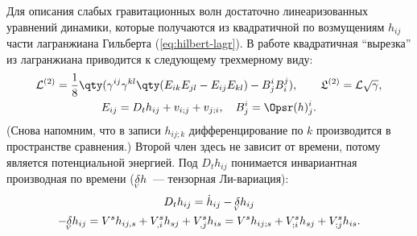 \documentclass[\docroot/reports/draft/report.tex]{subfiles}
\begin{document}
    Для описания слабых гравитационных волн достаточно линеаризованных уравнений динамики, которые получаются из квадратичной по возмущениям $h_{ij}$ части лагранжиана Гильберта (\autoref{eq:hilbert-lagr}). В работе \cite{burlankov_grav_waves} квадратичная \enquote{вырезка} из лагранжиана приводится к следующему трехмерному виду:
    \begin{equation}\label{eq:lagr2}
        \begin{gathered}
            \mathcal{L}^{(2)} = \frac{1}{8} \qty(
                \gamma^{ij} \gamma^{kl} \qty(
                    E_{ik} E_{jl} - E_{ij} E_{kl}
                ) - B^i_j B^j_i
            ), \qquad \mathfrak{L}^{(2)} = \mathcal{L}\sqrt{\gamma} ,\\
            E_{ij} = D_t{h}_{ij} + v_{i;j} + v_{j;i}, \quad
            B^i_j = \Opsr(h)^i_j .
        \end{gathered}
    \end{equation}
    (Снова напомним, что в записи $h_{ij;k}$ дифференцирование по $k$ производится в пространстве сравнения.) Второй член здесь не зависит от времени, потому является потенциальной энергией. Под $D_t{h}_{ij}$ понимается инвариантная производная по времени ($\underaccent{V}{\delta} h$~--- тензорная Ли-вариация):
    \begin{gather}
        D_t{h}_{ij} =
            \dot{h}_{ij} - \underaccent{V}{\delta} h_{ij}\\
        -\underaccent{V}{\delta} h_{ij} =
            V^s h_{ij,s} + V^s_{,i} h_{sj} + V^s_{,j} h_{is} =
            V^s h_{ij;s} + V^s_{;i} h_{sj} + V^s_{;j} h_{is} .
    \end{gather}
\end{document}
